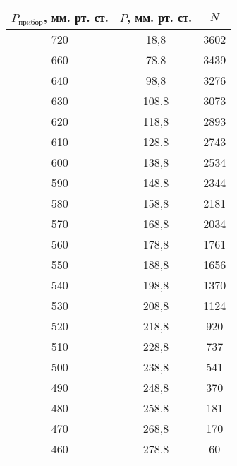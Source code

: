 \begin{table}[h!]
    \begin{tabular}{|c|c|c|}
    \hline
    $P_{\text{прибор}}$, мм. рт. ст. & $P$, мм. рт. ст. & $N$    \\ \hline
    720                              & 18,8             & 3602   \\ \hline
    660                              & 78,8             & 3439   \\ \hline
    640                              & 98,8             & 3276   \\ \hline
    630                              & 108,8            & 3073   \\ \hline
    620                              & 118,8            & 2893   \\ \hline
    610                              & 128,8            & 2743   \\ \hline
    600                              & 138,8            & 2534   \\ \hline
    590                              & 148,8            & 2344   \\ \hline
    580                              & 158,8            & 2181   \\ \hline
    570                              & 168,8            & 2034   \\ \hline
    560                              & 178,8            & 1761   \\ \hline
    550                              & 188,8            & 1656   \\ \hline
    540                              & 198,8            & 1370   \\ \hline
    530                              & 208,8            & 1124   \\ \hline
    520                              & 218,8            & 920    \\ \hline
    510                              & 228,8            & 737    \\ \hline
    500                              & 238,8            & 541    \\ \hline
    490                              & 248,8            & 370    \\ \hline
    480                              & 258,8            & 181    \\ \hline
    470                              & 268,8            & 170    \\ \hline
    460                              & 278,8            & 60     \\ \hline

\end{tabular}
\end{table}
